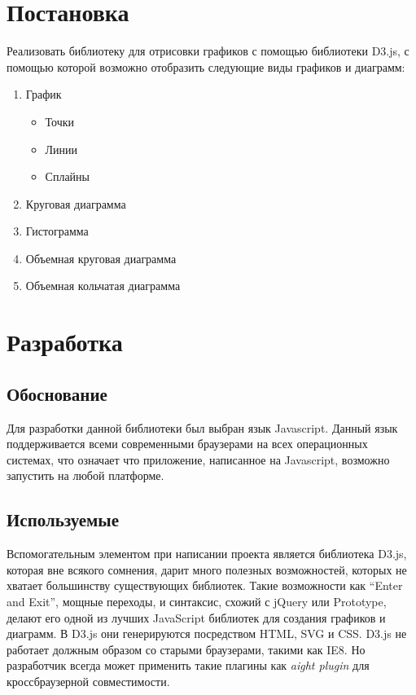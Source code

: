 \documentclass[a4paper,14pt]{extreport}
\begin{document}
\newpage
\chapter{Постановка}
\hspace{4ex}Реализовать библиотеку для отрисовки графиков с помощью библиотеки D3.js, с помощью которой возможно отобразить следующие виды графиков и диаграмм:
\begin{enumerate}
	\item График
		\begin{itemize}
		\item Точки
		\item Линии 
		\item Сплайны
		\end{itemize}
	\item Круговая диаграмма
	\item Гистограмма
	\item Объемная круговая диаграмма
	\item Объемная кольчатая диаграмма
\end{enumerate}
\newpage
\chapter{Разработка}
\section{Обоснование}
\hspace{4ex}Для разработки данной библиотеки был выбран язык Javascript. Данный язык поддерживается всеми современными браузерами на всех операционных системах, что означает что приложение, написанное на Javascript, возможно запустить на любой платформе.\\
\section{Используемые}
\hspace{4ex}Вспомогательным элементом при написании проекта является библиотека D3.js, которая вне всякого сомнения, дарит много полезных возможностей, которых не хватает большинству существующих библиотек. Такие возможности как “Enter and Exit”, мощные переходы, и синтаксис, схожий с jQuery или Prototype, делают его одной из лучших JavaScript библиотек для создания графиков и диаграмм. В D3.js они генерируются посредством HTML, SVG и CSS. D3.js не работает должным образом со старыми браузерами, такими как IE8. Но разработчик всегда может применить такие плагины как \textit{aight plugin} для кроссбраузерной совместимости.
\end{document}

